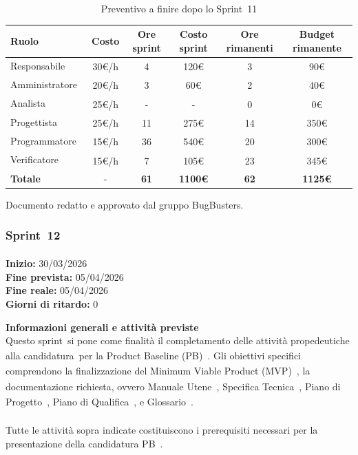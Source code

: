 \documentclass[a4paper,12pt]{article}
\newcommand{\pediceG}{\texorpdfstring{\textsubscript{\scalebox{0.6}{\textbf{G}}}~}{G}}
\begin{document}
\begin{table}[H]
\centering
\footnotesize
\begin{tabular}{|l|c|c|c|c|c|}
\hline
Ruolo & Costo & Ore sprint & Costo sprint & Ore rimanenti & Budget rimanente \\
\hline
Responsabile\pediceG & 30€/h & 4 & 120€ & 3 & 90€ \\
\hline
Amministratore\pediceG & 20€/h & 3 & 60€ & 2 & 40€ \\
\hline
Analista\pediceG & 25€/h & - & - & 0 & 0€ \\
\hline
Progettista\pediceG & 25€/h & 11 & 275€ & 14 & 350€ \\
\hline
Programmatore\pediceG & 15€/h & 36 & 540€ & 20 & 300€ \\
\hline
Verificatore\pediceG & 15€/h & 7 & 105€ & 23 & 345€ \\
\hline
\textbf{Totale} & - & \textbf{61} & \textbf{1100€} & \textbf{62} & \textbf{1125€} \\
\hline
\end{tabular}
\caption{Preventivo a finire dopo lo Sprint\pediceG 11}
\label{tab:risorse-sprint11}
\end{table}
 
\vfill
\begin{center}
    {\small\color{darkgray} Documento redatto e approvato dal gruppo BugBusters.}
\end{center}

\subsubsection{Sprint\pediceG 12}

\textbf{Inizio:} 30/03/2026 \\
\textbf{Fine prevista:} 05/04/2026 \\
\textbf{Fine reale:} 05/04/2026 \\
\textbf{Giorni di ritardo:} 0
 
\noindent\textbf{Informazioni generali e attività previste}\\
Questo sprint\pediceG si pone come finalità il completamento delle attività propedeutiche alla candidatura\pediceG per la Product Baseline (PB)\pediceG. Gli obiettivi specifici comprendono la finalizzazione del Minimum Viable Product (MVP)\pediceG, la documentazione richiesta, ovvero Manuale Utene\pediceG, Specifica Tecnica\pediceG, Piano di Progetto\pediceG, Piano di Qualifica\pediceG, e Glossario\pediceG.\\\\ Tutte le attività sopra indicate costituiscono i prerequisiti necessari per la presentazione della candidatura PB\pediceG.\\
 
\end{document}
